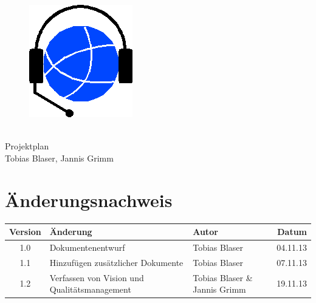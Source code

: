 
\usepackage{csvsimple}

\providecommand{\documentType}{Projektplan}
\providecommand{\versionnumber}{1.0}



\thispagestyle{empty}
\begin{titlepage}
	\begin{center}

	\vspace*{40mm}
	
	\begin{figure}[htp]
		\centering
		\includegraphics[scale=0.60]{../img/icon-js-voip.png}
	\end{figure}		
	\vspace*{20mm}
	
	{\fontsize{40}{48} \selectfont \project \\[10mm]}
	{\fontsize{40}{48} \selectfont \documentType \\[5mm]}	
	\vspace*{20mm}
	Tobias Blaser, Jannis Grimm

\end{center}
\end{titlepage}
\clearpage

\chapter*{Änderungsnachweis}
\begin{tabularx}{\textwidth}{|cXlr|} %
		\hline
		\textbf{Version} & \textbf{Änderung} & \textbf{Autor} & \textbf{Datum}\\
		\hline
		1.0 & Dokumentenentwurf & Tobias Blaser & 04.11.13\\
		1.1 & Hinzufügen zusätzlicher Dokumente & Tobias Blaser & 07.11.13\\
		1.2 & Verfassen von Vision und Qualitätsmanagement & Tobias Blaser \& Jannis Grimm & 19.11.13\\
		\hline
\end{tabularx}

